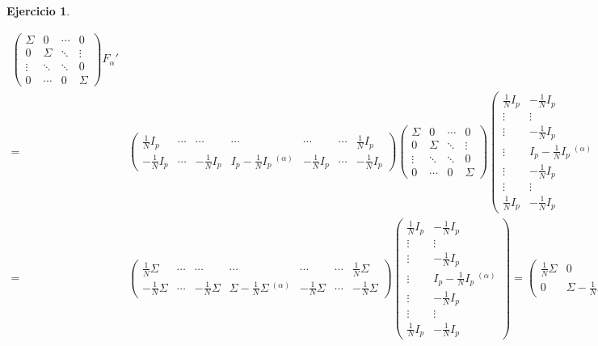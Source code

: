 \documentclass[12pt,spanish]{article}
\theoremstyle{definition}
\newtheorem{exercise}{Ejercicio}
\begin{document}
\begin{exercise}
\begin{enumerate}[$a)$]
\begin{align*}
\begin{pmatrix}
        \Sigma & 0 & \cdots & 0 \\
        0 & \Sigma & \ddots & \vdots \\
        \vdots & \ddots & \ddots & 0\\
        0 & \cdots & 0 & \Sigma
      \end{pmatrix}F_\alpha' \\
      =&\begin{pmatrix}
        \frac{1}{N}I_p & \cdots & \cdots & \cdots & \cdots & \cdots & \frac{1}{N}I_p \\
        -\frac{1}{N}I_p & \cdots & -\frac{1}{N}I_p & I_p-\frac{1}{N}I_p~^{(\alpha)} & -\frac{1}{N}I_p & \cdots & -\frac{1}{N}I_p
      \end{pmatrix}
    \begin{pmatrix}
        \Sigma & 0 & \cdots & 0 \\
        0 & \Sigma & \ddots & \vdots \\
        \vdots & \ddots & \ddots & 0\\
        0 & \cdots & 0 & \Sigma
      \end{pmatrix}\begin{pmatrix}
        \frac{1}{N}I_p & -\frac{1}{N}I_p \\ \vdots & \vdots \\ \vdots & -\frac{1}{N}I_p \\ \vdots & I_p-\frac{1}{N}I_p~^{(\alpha)} \\ \vdots & -\frac{1}{N}I_p \\ \vdots & \vdots \\ \frac{1}{N}I_p & -\frac{1}{N}I_p 
      \end{pmatrix}\\
      =&\begin{pmatrix}
        \frac{1}{N}\Sigma & \cdots & \cdots & \cdots & \cdots & \cdots & \frac{1}{N}\Sigma \\
        -\frac{1}{N}\Sigma & \cdots & -\frac{1}{N}\Sigma & \Sigma-\frac{1}{N}\Sigma~^{(\alpha)} & -\frac{1}{N}\Sigma & \cdots & -\frac{1}{N}\Sigma
      \end{pmatrix}\begin{pmatrix}
        \frac{1}{N}I_p & -\frac{1}{N}I_p \\ \vdots & \vdots \\ \vdots & -\frac{1}{N}I_p \\ \vdots & I_p-\frac{1}{N}I_p~^{(\alpha)} \\ \vdots & -\frac{1}{N}I_p \\ \vdots & \vdots \\ \frac{1}{N}I_p & -\frac{1}{N}I_p 
      \end{pmatrix}=
      \begin{pmatrix} \frac{1}{N}\Sigma & 0 \\ 0 & \Sigma - \frac{1}{N}\Sigma \end{pmatrix}
    \end{align*}


\end{enumerate}
\end{exercise}
\end{document}
